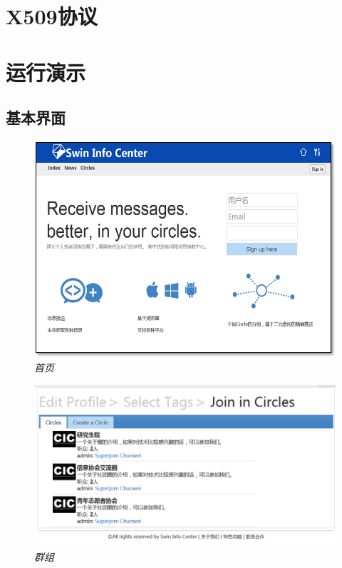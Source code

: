 \documentclass[a4paper]{ctexart}
\begin{document}
\section{X509协议}

\section{运行演示}
    \subsection{基本界面}
    \begin{figure}[htpb]
        \begin{center}
            \includegraphics{File3.png}
            \caption{\small \sl 首页}
            \label{fig:website-index}
        \end{center}
    \end{figure}
    \begin{figure}[htpb]
        \centering
        \includegraphics{File4.png}
        \caption{\small \sl 群组}
        \label{fig:website-circle}
    \end{figure}
\end{document}
